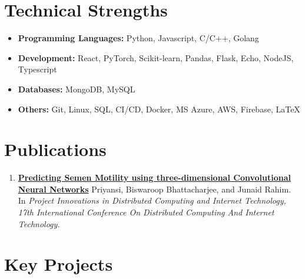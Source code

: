 \documentclass[11pt,a4paper,calibri]{moderncv}        %
\begin{document}
	\vspace{-12pt}
	\section{Technical Strengths}
	
	\begin{itemize}[leftmargin=.2in]
		\setlength\itemsep{.2em}
		
		\item \textbf{Programming Languages:} Python, Javascript, C/C++, Golang
		\vspace{-4pt}
		\item \textbf{Development:} React, PyTorch, Scikit-learn,  Pandas, Flask, Echo, NodeJS, Typescript
		\vspace{-4pt}
		\item \textbf{Databases:} MongoDB, MySQL
		\vspace{-4pt}
		\item \textbf{Others:} Git, Linux, SQL, CI/CD, Docker, MS Azure, AWS, Firebase, \LaTeX
		
	\end{itemize}

	\vspace{-15pt}
	\section{Publications}
	
	\begin{enumerate}
		
		\item \href{https://arxiv.org/abs/2101.02888}{\textbf{Predicting Semen Motility using three-dimensional
			Convolutional Neural Networks}} Priyansi, Biswaroop Bhattacharjee, and Junaid Rahim. In \textit{Project Innovations in Distributed Computing and Internet Technology, 17th International Conference On Distributed Computing And Internet Technology.
		}
	\end{enumerate}
	
	\vspace{-15pt}
	\section{Key Projects}
	
\end{document}
